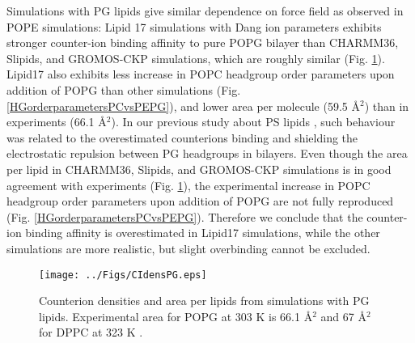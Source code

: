 \documentclass[aps,prl,superscriptaddress,twocolumn]{revtex4}
\begin{document}
Simulations with PG lipids give similar dependence on force field as observed in POPE simulations:
Lipid 17 simulations with Dang ion parameters exhibits stronger counter-ion binding affinity to pure POPG bilayer
than CHARMM36, Slipids, and GROMOS-CKP simulations, which are roughly similar (Fig. \ref{CIdensPG}).
Lipid17 also exhibits less increase in POPC headgroup
order parameters upon addition of POPG than other simulations (Fig. \ref{HGorderparametersPCvsPEPG}),
and lower area per molecule (59.5 {\AA}$^2$) than in experiments (66.1 {\AA}$^2$).
In our previous study about PS lipids \cite{antila18}, such behaviour was related to 
the overestimated counterions binding and shielding the electrostatic repulsion between PG headgroups
in bilayers.%
%
Even though the area per lipid in CHARMM36, Slipids, and GROMOS-CKP simulations is in good agreement
with experiments (Fig. \ref{CIdensPG}), the experimental increase in 
POPC headgroup order parameters upon addition of POPG are not fully reproduced (Fig. \ref{HGorderparametersPCvsPEPG}).
Therefore we conclude that the counter-ion binding affinity is overestimated in Lipid17 simulations,
while the other simulations are more realistic, but slight overbinding cannot be excluded.
\begin{figure}[]
  \centering
  \texttt{[image: ../Figs/CIdensPG.eps]}
  \caption{\label{CIdensPG}
    Counterion densities and area per lipids from simulations with PG lipids.
    Experimental area for POPG at 303 K is 66.1 {\AA}$^2$ and 67 {\AA}$^2$ for DPPC at 323 K \cite{pan12b}.
  }
\end{figure}
\end{document}
